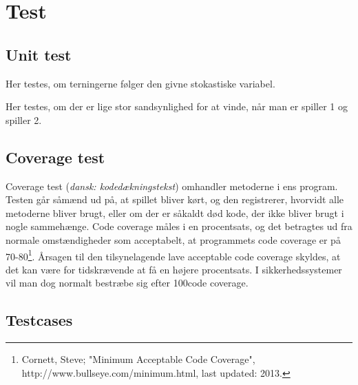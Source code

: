 \chapter{Test}

\section{Unit test}
Her testes, om terningerne følger den givne stokastiske variabel.

Her testes, om der er lige stor sandsynlighed for at vinde, når man er spiller 1 og spiller 2.

\section{Coverage test}
Coverage test (\textit{dansk: kodedækningstekst}) omhandler metoderne i ens program.
Testen går såmænd ud på, at spillet bliver kørt, og den registrerer, hvorvidt alle metoderne bliver brugt, eller om der er såkaldt død kode, der ikke bliver brugt i nogle sammehænge.
Code coverage måles i en procentsats, og det betragtes ud fra normale omstændigheder som acceptabelt, at programmets code coverage er på 70-80\percent\footnote{Cornett, Steve; "Minimum Acceptable Code Coverage", http://www.bullseye.com/minimum.html, last updated: 2013. }.
Årsagen til den tilsynelagende lave acceptable code coverage skyldes, at det kan være for tidskrævende at få en højere procentsats.
I sikkerhedssystemer vil man dog normalt bestræbe sig efter 100\percent code coverage.


\section{Testcases}
